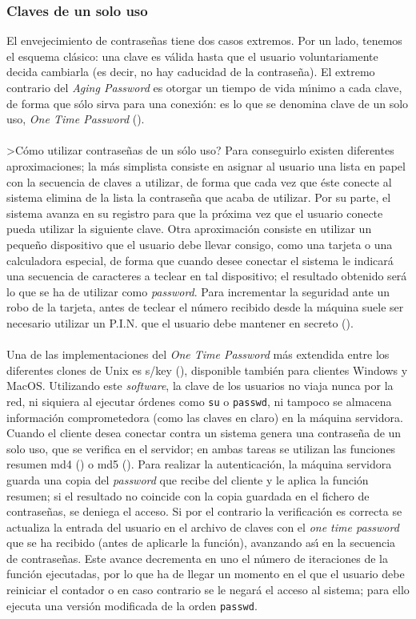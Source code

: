 \subsubsection{Claves de un solo uso}
El envejecimiento de contrase\~nas tiene dos casos extremos. Por un lado, 
tenemos el esquema cl\'asico: una clave es v\'alida hasta que el usuario 
voluntariamente decida cambiarla (es decir, no hay caducidad de 
la contrase\~na). El extremo contrario del {\it Aging Password} es otorgar un 
tiempo de vida m\'{\i}nimo a cada clave, de forma que s\'olo sirva para una 
conexi\'on: es lo que se denomina clave de un solo uso, {\it One Time Password} 
(\cite{kn:lam81}).\\
\\>C\'omo utilizar contrase\~nas de un s\'olo uso? Para conseguirlo existen
diferentes aproximaciones; la m\'as simplista consiste en asignar al usuario
una lista en papel con la secuencia de claves a utilizar, de forma que cada
vez que \'este conecte al sistema elimina de la lista la contrase\~na que acaba 
de utilizar. Por su parte, el sistema avanza en su registro para que la
pr\'oxima vez que el usuario conecte pueda utilizar la siguiente clave. Otra
aproximaci\'on consiste en utilizar un peque\~no dispositivo que el usuario 
debe llevar consigo, como una tarjeta o una calculadora especial, de forma que
cuando desee conectar el sistema le indicar\'a una secuencia de caracteres a
teclear en tal dispositivo; el resultado obtenido ser\'a lo que se ha de 
utilizar como {\it password}. Para incrementar la seguridad ante un robo de la
tarjeta, antes de teclear el n\'umero recibido desde la m\'aquina suele ser
necesario utilizar un P.I.N. que el usuario debe mantener en secreto 
(\cite{kn:spa96}).\\
\\Una de las implementaciones del {\it One Time Password} m\'as extendida entre
los diferentes clones de Unix es {\sc s/key} (\cite{kn:hal94}), disponible 
tambi\'en para clientes Windows y MacOS. Utilizando este {\it software}, la
clave de los usuarios no viaja nunca por la red, ni siquiera al ejecutar 
\'ordenes como {\tt su} o {\tt passwd}, ni tampoco se almacena informaci\'on
comprometedora (como las claves en claro) en la m\'aquina servidora. Cuando el
cliente desea conectar contra un sistema genera una contrase\~na de un solo
uso, que se verifica en el servidor; en ambas tareas se utilizan las funciones
resumen {\sc md4} (\cite{kn:riv90}) o {\sc md5} (\cite{kn:riv92}). Para realizar
la autenticaci\'on, la m\'aquina servidora guarda una copia del {\it password}
que recibe del cliente y le aplica la funci\'on resumen; si el resultado no
coincide con la copia guardada en el fichero de contrase\~nas, se deniega el
acceso. Si por el contrario la verificaci\'on es correcta se actualiza la 
entrada del usuario en el archivo de claves con el {\it one time password} que
se ha recibido (antes de aplicarle la funci\'on), avanzando as\'{\i} en la
secuencia de contrase\~nas. Este avance decrementa en uno el n\'umero de 
iteraciones de la funci\'on ejecutadas, por lo que ha de llegar un momento 
en el que el usuario debe reiniciar el contador o en caso contrario se le
negar\'a el acceso al sistema; para ello ejecuta una versi\'on modificada de 
la orden {\tt passwd}.
